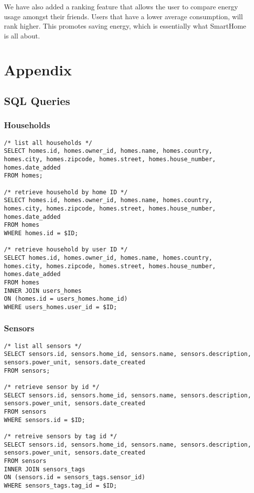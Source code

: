 \documentclass[11pt]{article}
\begin{document}
	We have also added a ranking feature that allows the user to compare energy usage amongst their friends.
	Users that have a lower average consumption, will rank higher. This promotes saving energy, which is essentially what SmartHome is all about.

\section{Appendix}
  \subsection{SQL Queries}
  \subsubsection{Households}
\begin{lstlisting}[style=SQL]
/* list all households */
SELECT homes.id, homes.owner_id, homes.name, homes.country, homes.city, homes.zipcode, homes.street, homes.house_number, homes.date_added
FROM homes;

/* retrieve household by home ID */
SELECT homes.id, homes.owner_id, homes.name, homes.country, homes.city, homes.zipcode, homes.street, homes.house_number, homes.date_added
FROM homes
WHERE homes.id = $ID;

/* retrieve household by user ID */
SELECT homes.id, homes.owner_id, homes.name, homes.country, homes.city, homes.zipcode, homes.street, homes.house_number, homes.date_added
FROM homes
INNER JOIN users_homes
ON (homes.id = users_homes.home_id)
WHERE users_homes.user_id = $ID;
\end{lstlisting}

  \subsubsection{Sensors}
\begin{lstlisting}[style=SQL]
/* list all sensors */
SELECT sensors.id, sensors.home_id, sensors.name, sensors.description, sensors.power_unit, sensors.date_created
FROM sensors;

/* retrieve sensor by id */
SELECT sensors.id, sensors.home_id, sensors.name, sensors.description, sensors.power_unit, sensors.date_created
FROM sensors
WHERE sensors.id = $ID;

/* retreive sensors by tag id */
SELECT sensors.id, sensors.home_id, sensors.name, sensors.description, sensors.power_unit, sensors.date_created
FROM sensors
INNER JOIN sensors_tags
ON (sensors.id = sensors_tags.sensor_id)
WHERE sensors_tags.tag_id = $ID;
\end{lstlisting}
\end{document}
